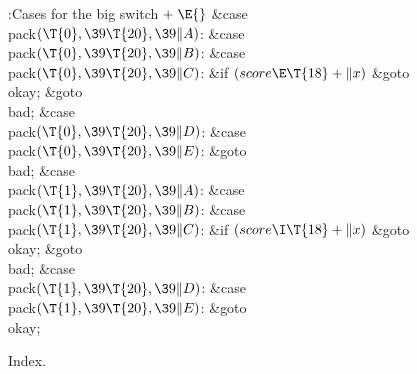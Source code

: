 \Y\B\4:Cases for the big switch\X${}\mathrel+\E{}$\6
\4\&{case} \\{pack}${}(\T{0},\39\T{20},\39\|A){}$:\5
\&{case} \\{pack}${}(\T{0},\39\T{20},\39\|B){}$:\5
\&{case} \\{pack}${}(\T{0},\39\T{20},\39\|C){}$:\6
\&{if} ${}(\\{score}\E\T{18}+\|x){}$\1\5
\&{goto} \\{okay};\5
\2\&{goto} \\{bad};\6
\4\&{case} \\{pack}${}(\T{0},\39\T{20},\39\|D){}$:\5
\&{case} \\{pack}${}(\T{0},\39\T{20},\39\|E){}$:\5
\&{goto} \\{bad};\6
\4\&{case} \\{pack}${}(\T{1},\39\T{20},\39\|A){}$:\5
\&{case} \\{pack}${}(\T{1},\39\T{20},\39\|B){}$:\5
\&{case} \\{pack}${}(\T{1},\39\T{20},\39\|C){}$:\6
\&{if} ${}(\\{score}\I\T{18}+\|x){}$\1\5
\&{goto} \\{okay};\5
\2\&{goto} \\{bad};\6
\4\&{case} \\{pack}${}(\T{1},\39\T{20},\39\|D){}$:\5
\&{case} \\{pack}${}(\T{1},\39\T{20},\39\|E){}$:\5
\&{goto} \\{okay};\par
\fi

Index.
\fi

\inx
\fin
\con

